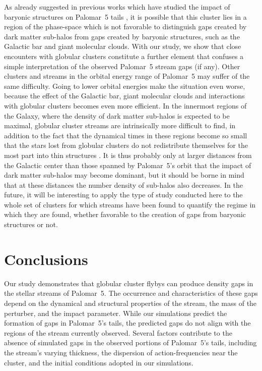 \documentclass[draft]{aa}
\begin{document}
  As already suggested in previous works which have studied the impact of baryonic structures on Palomar~5 tails \citep{2017NatAs...1..633P, 2019MNRAS.484.2009B}, it is possible that this cluster lies in a region of the phase-space which is not favorable to distinguish gaps created by dark matter sub-halos from gaps created by baryonic structures, such as the Galactic bar and giant molecular clouds. With our study, we show that close encounters with globular clusters constitute a further element that confuses a simple interpretation of the observed Palomar~5 stream gaps (if any). Other clusters and streams in the orbital energy range of Palomar~5 may suffer of the same difficulty. Going to lower orbital energies make the situation even worse, because the effect of the Galactic bar, giant molecular clouds and interactions with globular clusters becomes even more efficient. In the innermost regions of the Galaxy, where the density of dark matter sub-halos is expected to be maximal, globular cluster streams are intrinsically more difficult to find, in addition to the fact that the dynamical times in these regions become so small that the stars lost from globular clusters do not redistribute themselves for the most part into thin structures \citep[see][]{2023A&A...673A..44F}. It is thus probably only at larger distances from the Galactic center than those spanned by Palomar~5's orbit that the impact of dark matter sub-halos may become dominant, but it should be borne in mind that at these distances the number density of sub-halos also decreases. In the future, it will be interesting to apply the type of study conducted here to the whole set of clusters for which streams have been found to quantify the regime in which they are found, whether favorable to the creation of gaps from baryonic structures or not.
  

  
\section{Conclusions}
  Our study demonstrates that globular cluster flybys can produce density gaps in the stellar streams of Palomar~5. The occurrence and characteristics of these gaps depend on the dynamical and structural properties of the stream, the mass of the perturber, and the impact parameter. While our simulations predict the formation of gaps in Palomar~5's tails, the predicted gaps do not align with the regions of the stream currently observed. Several factors contribute to the absence of simulated gaps in the observed portions of Palomar~5's tails, including the stream's varying thickness, the dispersion of action-frequencies near the cluster, and the initial conditions adopted in our simulations. 
\end{document}
